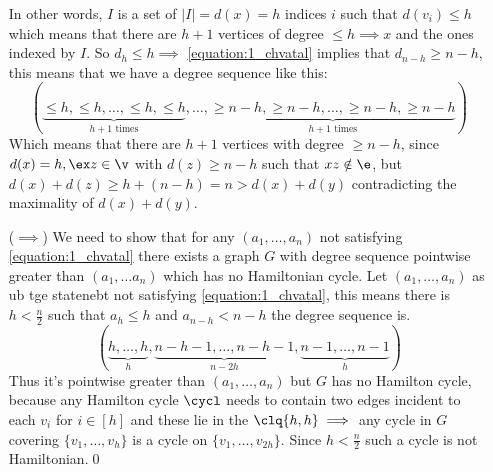 \begin{prf}
\begin{itemize}
        In other words, $I$ is a set of $|I| = d(x) = h$ indices $i$ such that $d(v_i) \leq h$ which means that there are $h + 1$ vertices of degree $\leq h \implies x $ and the ones indexed by $I$. So $d_h \leq h \implies$ \ref{equation:1_chvatal} implies that $d_{n - h} \geq n - h$, this means that we have a degree sequence like this:
        \begin{equation*}
            (\underbrace{\leq h, \leq h, \dots, \leq h, \leq h}_\text{$h + 1$ times}, \dots, \underbrace{\geq n - h, \geq n - h, \dots, \geq n - h, \geq n - h}_\text{$h + 1$ times})
        \end{equation*}
        Which means that there are $h + 1$ vertices with degree $\geq n - h$, since $d(x) = h, \ex z \in \v$ with $d(z) \geq n - h$ such that $xz \notin \e$, but $d(x) + d(z) \geq h + (n - h) = n > d(x) + d(y)$ contradicting the maximality of $d(x) + d(y)$.
        \item[($\implies$)] We need to show that for any $(a_1, \dots, a_n)$ not satisfying \ref{equation:1_chvatal} there exists a graph $G$ with degree sequence pointwise greater than $(a_1, \dots a_n)$ which has no Hamiltonian cycle. Let $(a_1, \dots, a_n)$ as ub tge statenebt not satisfying \ref{equation:1_chvatal}, this means there is $h < \frac{n}{2}$ such that $a_h \leq h$ and $a_{n - h} < n - h$ the degree sequence is.
        \begin{equation*}
            (
                \underbrace{h, \dots, h}_{h},
                \underbrace{n - h - 1, \dots, n - h - 1}_{n - 2h},
                \underbrace{n - 1, \dots, n - 1}_{h}
            )
        \end{equation*}
        Thus it's pointwise greater than $(a_1, \dots, a_n)$ but $G$ has no Hamilton cycle, because any Hamilton cycle $\cycl$ needs to contain two edges incident to each $v_i$ for $i \in [h]$ and these lie in the $\clq{h,h} \implies$ any cycle in $G$ covering $\{v_1, \dots, v_h\}$ is a cycle on $\{v_1, \dots, v_{2h}\}$. Since $h < \frac{n}{2}$ such a cycle is not Hamiltonian.\qed
    \end{itemize}
\end{prf}